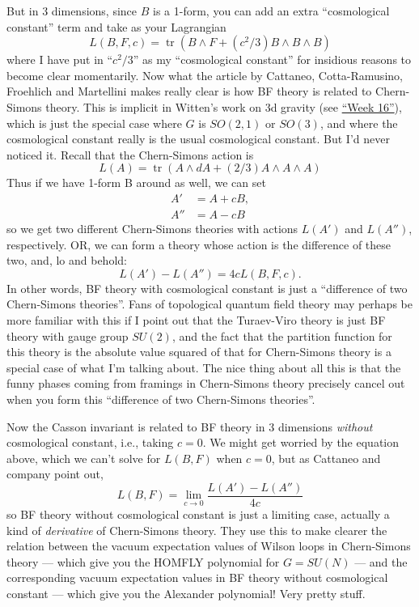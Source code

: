 \documentclass{article}
\begin{document}
But in 3 dimensions, since \(B\) is a 1-form, you can add an extra
``cosmological constant'' term and take as your Lagrangian
\[L(B,F,c) = \operatorname{tr}(B \wedge F + (c^2/3) B \wedge B \wedge B)\]
where I have put in ``\(c^2/3\)'' as my ``cosmological constant'' for
insidious reasons to become clear momentarily. Now what the article by
Cattaneo, Cotta-Ramusino, Froehlich and Martellini makes really clear is
how BF theory is related to Chern-Simons theory. This is implicit in
Witten's work on 3d gravity (see \protect\hyperlink{week16}{``Week
16''}), which is just the special case where \(G\) is \(SO(2,1)\) or
\(SO(3)\), and where the cosmological constant really is the usual
cosmological constant. But I'd never noticed it. Recall that the
Chern-Simons action is
\[L(A) = \operatorname{tr}(A \wedge dA + (2/3)A \wedge A \wedge A)\]
Thus if we have 1-form B around as well, we can set \[
  \begin{aligned}
    A' &= A + cB,
  \\A'' &= A - cB
  \end{aligned}
\] so we get two different Chern-Simons theories with actions \(L(A')\)
and \(L(A'')\), respectively. OR, we can form a theory whose action is
the difference of these two, and, lo and behold:
\[L(A') - L(A'') = 4cL(B,F,c).\] In other words, BF theory with
cosmological constant is just a ``difference of two Chern-Simons
theories''. Fans of topological quantum field theory may perhaps be more
familiar with this if I point out that the Turaev-Viro theory is just BF
theory with gauge group \(SU(2)\), and the fact that the partition
function for this theory is the absolute value squared of that for
Chern-Simons theory is a special case of what I'm talking about. The
nice thing about all this is that the funny phases coming from framings
in Chern-Simons theory precisely cancel out when you form this
``difference of two Chern-Simons theories''.

Now the Casson invariant is related to BF theory in 3 dimensions
\emph{without} cosmological constant, i.e., taking \(c = 0\). We might
get worried by the equation above, which we can't solve for \(L(B,F)\)
when \(c = 0\), but as Cattaneo and company point out,
\[L(B,F) = \lim_{c\to0}\frac{L(A')-L(A'')}{4c}\] so BF theory without
cosmological constant is just a limiting case, actually a kind of
\emph{derivative} of Chern-Simons theory. They use this to make clearer
the relation between the vacuum expectation values of Wilson loops in
Chern-Simons theory --- which give you the HOMFLY polynomial for
\(G = SU(N)\) --- and the corresponding vacuum expectation values in BF
theory without cosmological constant --- which give you the Alexander
polynomial! Very pretty stuff.
\end{document}
